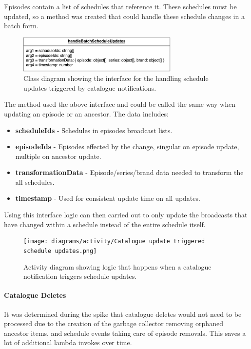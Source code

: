   Episodes contain a list of schedules that reference it. These schedules must be updated, so a method was created that could handle these
  schedule changes in a batch form.

  \begin{figure}[H]
    \centering
    \includegraphics[width=8cm]{assets/handleBatchScheduleInterface.drawio.png}
    \caption{Class diagram showing the interface for the handling schedule updates triggered by catalogue notifications.}
    \label{fig:catalogueTriggeredScheduleUpdateClass}
  \end{figure}

  The method used the above interface and could be called the same way when updating an episode or an ancestor. The data includes:
  \begin{itemize}
    \item \textbf{scheduleIds} - Schedules in episodes broadcast lists.
    \item \textbf{episodeIds} - Episodes effected by the change, singular on episode update, multiple on ancestor update.
    \item \textbf{transformationData} - Episode/series/brand data needed to transform the all schedules.
    \item \textbf{timestamp} - Used for consistent update time on all updates.
  \end{itemize}

  Using this interface logic can then carried out to only update the broadcasts that have changed within a schedule instead of the 
  entire schedule itself.

  \begin{figure}[H]
    \centering
    \texttt{[image: diagrams/activity/Catalogue update triggered schedule updates.png]}
    \caption{Activity diagram showing logic that happens when a catalogue notification triggers schedule updates.}
    \label{fig:catalogueTriggeredScheduleUpdateActivity}
  \end{figure}

  \paragraph{Catalogue Deletes}
  It was determined during the spike that catalogue deletes would not need to be processed due to the creation of the garbage collector removing 
  orphaned ancestor items, and schedule events taking care of episode removals. This saves a lot of additional lambda invokes over time.


